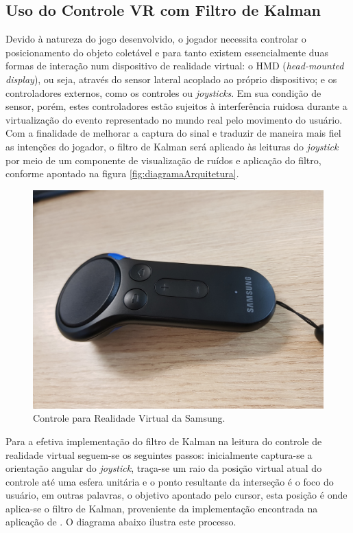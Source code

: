 \documentclass[conference]{IEEEtran}
\begin{document}
\subsection{Uso do Controle VR com Filtro de Kalman} \label{sec:gearvrcontroller}
Devido à natureza do jogo desenvolvido, o jogador necessita controlar o posicionamento do objeto coletável e para tanto existem essencialmente duas formas de interação num dispositivo de realidade virtual: o HMD (\textit{head-mounted display}), ou seja, através do sensor lateral acoplado ao próprio dispositivo; e os controladores externos, como os controles ou \textit{joysticks}. Em sua condição de sensor, porém, estes controladores estão sujeitos à interferência ruidosa durante a virtualização do evento representado no mundo real pelo movimento do usuário. Com a finalidade de melhorar a captura do sinal e traduzir de maneira mais fiel as intenções do jogador, o filtro de Kalman será aplicado às leituras do \textit{joystick} por meio de um componente de visualização de ruídos e aplicação do filtro, conforme apontado na figura \ref{fig:diagramaArquitetura}.

\begin{figure}[ht]
\centering
\includegraphics[width=.4\textwidth]{../images/gear_controller.jpg}
\caption{Controle para Realidade Virtual da Samsung.}
\label{fig:vrcontroller}
\end{figure}

Para a efetiva implementação do filtro de Kalman na leitura do controle de realidade virtual seguem-se os seguintes passos: inicialmente captura-se a orientação angular do \textit{joystick}, traça-se um raio da posição virtual atual do controle até uma esfera unitária e o ponto resultante da interseção é o foco do usuário, em outras palavras, o objetivo apontado pelo cursor, esta posição é onde aplica-se o filtro de Kalman, proveniente da implementação encontrada na aplicação de \cite{KalmanComponent}. O diagrama abaixo ilustra este processo.

\end{document}
